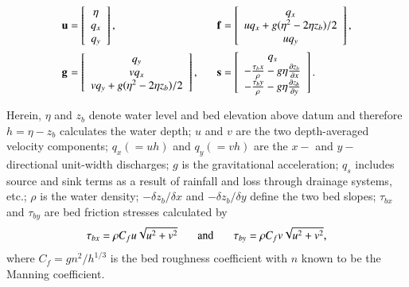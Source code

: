 \renewcommand{\arraystretch}{1.5}
\begin{equation}
	\label{SWETerms_1stO}
	\begin{alignedat}{4}
		&\textbf u && = \left[ \begin{array}{c}
			\eta \\
			q_x \\
			q_y
		\end{array} \right] , \hspace{4ex} &
		&\textbf f &&  = \left[ \begin{array}{c}
			q_x \\
			uq_x + g(\eta^2 - 2\eta z_b)/2 \\
			uq_y
		\end{array} \right] ,\\
		&\textbf g && = \left[ \begin{array}{c}
			q_y \\
 			vq_x \\
			vq_y + g(\eta^2 - 2\eta z_b)/2 \\
		\end{array} \right] , \hspace{4ex} &
		&\textbf s && = \left[ \begin{array}{c}
			q_s \\
			-\frac{\tau_bx}{\rho} - g\eta \frac{\partial z_b}{\partial x} \\
			-\frac{\tau_by}{\rho} - g\eta \frac{\partial z_b}{\partial y} \\
		\end{array} \right] .
	\end{alignedat}
\end{equation}

Herein, $\eta$ and $z_b$ denote water level and bed elevation above datum and therefore $h = \eta - z_b$ calculates the water depth; $u$ and $v$ are the two depth-averaged velocity components; $q_x (= uh)$ and $q_y (= vh)$ are the $x-$ and $y-$directional unit-width discharges; $g$ is the gravitational acceleration; $q_s$ includes source and sink terms as a result of rainfall and loss through drainage systems, etc.;  $\rho$ is the water density; $-\delta z_b / \delta x$ and $-\delta z_b / \delta y$ define the two bed slopes; $\tau _{bx}$ and $\tau _{by}$ are bed friction stresses calculated by
\begin{equation}
	\label{SWE_1stO_BedFriction}
	\tau _{bx} = \rho C_f u\sqrt{u^2 + v^2} 
	\hspace{4ex} \textrm{and} \hspace{4ex}
	\tau _{by} = \rho C_f v\sqrt{u^2 + v^2} 
	,
\end{equation}
where $C_f = gn^2 / h^{1/3}$ is the bed roughness coefficient with $n$ known to be the Manning coefficient.

